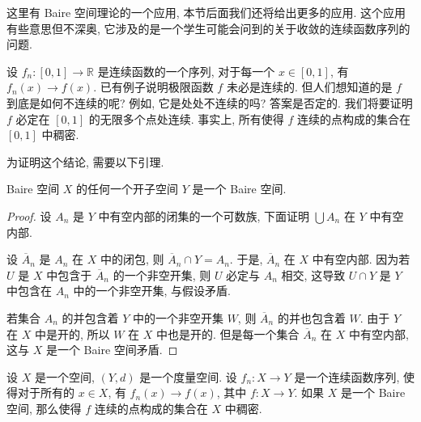这里有 Baire 空间理论的一个应用, 本节后面我们还将给出更多的应用. 这个应用有些意思但不深奥, 它涉及的是一个学生可能会问到的关于收敛的连续函数序列的问题.

设 $f_n\colon[0,1]\to\mathbb{R}$ 是连续函数的一个序列, 对于每一个 $x\in[0,1]$, 有 $f_n(x)\to f(x)$. 已有例子说明极限函数 $f$ 未必是连续的. 但人们想知道的是 $f$ 到底是如何不连续的呢? 例如, 它是处处不连续的吗? 答案是否定的. 我们将要证明 $f$ 必定在 $[0,1]$ 的无限多个点处连续. 事实上, 所有使得 $f$ 连续的点构成的集合在 $[0,1]$ 中稠密.

为证明这个结论, 需要以下引理.

\begin{lemma}
\label{lemma:ch08-sec48-48-4}
Baire 空间 $X$ 的任何一个开子空间 $Y$ 是一个 Baire 空间.
\end{lemma}

\begin{proof}
设 $A_n$ 是 $Y$ 中有空内部的闭集的一个可数族, 下面证明 $\bigcup A_n$ 在 $Y$ 中有空内部.

设 $\overline{A}_{n}$ 是 $A_n$ 在 $X$ 中的闭包, 则 $\overline{A}_{n}\cap Y=A_n$. 于是, $\overline{A}_{n}$ 在 $X$ 中有空内部. 因为若 $U$ 是 $X$ 中包含于 $\overline{A}_{n}$ 的一个非空开集, 则 $U$ 必定与 $A_n$ 相交, 这导致 $U\cap Y$ 是 $Y$ 中包含在 $A_n$ 中的一个非空开集, 与假设矛盾.

若集合 $A_n$ 的并包含着 $Y$ 中的一个非空开集 $W$, 则 $\overline{A}_{n}$ 的并也包含着 $W$. 由于 $Y$ 在 $X$ 中是开的, 所以 $W$ 在 $X$ 中也是开的. 但是每一个集合 $\overline{A}_{n}$ 在 $X$ 中有空内部, 这与 $X$ 是一个 Baire 空间矛盾.
\end{proof}

\begin{theorem}
\label{theorem:ch08-sec48-48-5}
设 $X$ 是一个空间, $(Y,d)$ 是一个度量空间. 设 $f_n\colon X\to Y$ 是一个连续函数序列, 使得对于所有的 $x\in X$, 有 $f_n(x)\to f(x)$, 其中 $f\colon X\to Y$. 如果 $X$ 是一个 Baire 空间, 那么使得 $f$ 连续的点构成的集合在 $X$ 中稠密.
\end{theorem}

